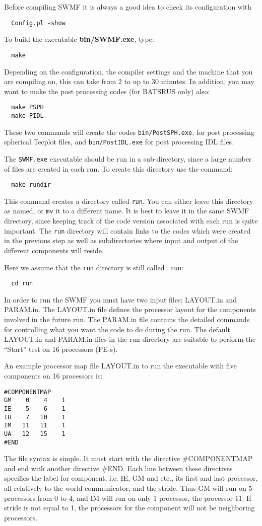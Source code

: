 Before compiling SWMF it is always a good idea to check its configuration
with
\begin{verbatim}
  Config.pl -show
\end{verbatim}

To build the executable {\bf bin/SWMF.exe}, type:
\begin{verbatim}
  make
\end{verbatim} 
Depending on the configuration, the compiler settings and the machine 
that you are compiling on, this can take from 2 to up to 30 minutes.  
In addition, you may want to make the post processing
codes (for BATSRUS only) also:
\begin{verbatim}
  make PSPH
  make PIDL
\end{verbatim} 
These two commands will create the codes {\tt bin/PostSPH.exe}, for post
processing spherical Tecplot files, and {\tt bin/PostIDL.exe} 
for post processing IDL files.

The {\tt SWMF.exe} executable should be run in a sub-directory, since a large number
of files are created in each run.  To create this directory use the
command:
\begin{verbatim}
  make rundir
\end{verbatim} 
This command creates a directory called {\tt run}.  You can either
leave this directory as named, or {\tt mv} it to a different name.  It
is best to leave it in the same SWMF directory, since
keeping track of the code version associated with each run is quite
important.  The {\tt run} directory will contain links to the codes
which were created in the previous step as well as subdirectories
where input and output of the different components will reside.

Here we assume that the {\tt run} directory is still called {\tt
run}:
\begin{verbatim}
  cd run
\end{verbatim}
In order to run the SWMF you must have two input files:  LAYOUT.in and
PARAM.in.  The LAYOUT.in file defines the processor
layout for the components involved in the future run.  The PARAM.in
file contains the detailed commands for controlling what you want the
code to do during the run.  The default LAYOUT.in and PARAM.in
files in the run directory are suitable to perform the ``Start'' test
on 16 processors (PE-s). 

An example processor map file LAYOUT.in to run the executable with
five components on 16 processors is:
\begin{verbatim}
#COMPONENTMAP
GM    0    4    1
IE    5    6    1
IH    7   10    1
IM   11   11    1
UA   12   15    1
#END
\end{verbatim}
The file syntax is simple. It must start with the directive
\#COMPONENTMAP and end with another directive \#END. Each line between
these directives specifies the label for component, i.e. IE, GM and
etc., its first and last processor, all relatively to the world
communicator, and the stride. Thus GM will run on 5 processors from 0
to 4, and IM will run on only 1 processor, the processor 11.  If
stride is not equal to 1, the processors for the component will not be
neighboring processors.

